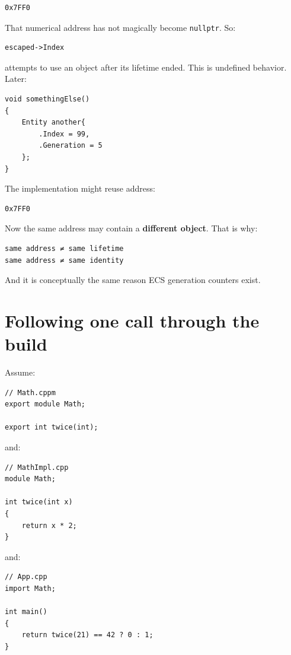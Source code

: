\begin{verbatim}
0x7FF0
\end{verbatim}

That numerical address has not magically become \texttt{nullptr}. So:

\begin{verbatim}
escaped->Index
\end{verbatim}

attempts to use an object after its lifetime ended. This is undefined behavior. Later:

\begin{verbatim}
void somethingElse()
{
    Entity another{
        .Index = 99,
        .Generation = 5
    };
}
\end{verbatim}

The implementation might reuse address:

\begin{verbatim}
0x7FF0
\end{verbatim}

Now the same address may contain a \textbf{different object}. That is why:

\begin{verbatim}
same address ≠ same lifetime
same address ≠ same identity
\end{verbatim}

And it is conceptually the same reason ECS generation counters exist.

\section{Following one call through the build}\label{05-engine-i-ch003-following-one-call-through-the-build}

Assume:

\begin{verbatim}
// Math.cppm
export module Math;

export int twice(int);
\end{verbatim}

and:

\begin{verbatim}
// MathImpl.cpp
module Math;

int twice(int x)
{
    return x * 2;
}
\end{verbatim}

and:

\begin{verbatim}
// App.cpp
import Math;

int main()
{
    return twice(21) == 42 ? 0 : 1;
}
\end{verbatim}

